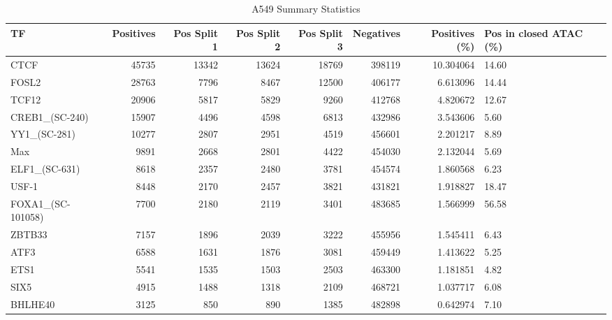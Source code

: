 \begin{table}
\caption{A549 Summary Statistics}
\label{tab:a549}
\begin{tabular}{lrrrrrrl}
\toprule
TF & Positives & Pos Split 1 & Pos Split 2 & Pos Split 3 & Negatives & Positives (\%) & Pos in closed ATAC (\%) \\
\midrule
CTCF & 45735 & 13342 & 13624 & 18769 & 398119 & 10.304064 & 14.60 \\
FOSL2 & 28763 & 7796 & 8467 & 12500 & 406177 & 6.613096 & 14.44 \\
TCF12 & 20906 & 5817 & 5829 & 9260 & 412768 & 4.820672 & 12.67 \\
CREB1\_(SC-240) & 15907 & 4496 & 4598 & 6813 & 432986 & 3.543606 & 5.60 \\
YY1\_(SC-281) & 10277 & 2807 & 2951 & 4519 & 456601 & 2.201217 & 8.89 \\
Max & 9891 & 2668 & 2801 & 4422 & 454030 & 2.132044 & 5.69 \\
ELF1\_(SC-631) & 8618 & 2357 & 2480 & 3781 & 454574 & 1.860568 & 6.23 \\
USF-1 & 8448 & 2170 & 2457 & 3821 & 431821 & 1.918827 & 18.47 \\
FOXA1\_(SC-101058) & 7700 & 2180 & 2119 & 3401 & 483685 & 1.566999 & 56.58 \\
ZBTB33 & 7157 & 1896 & 2039 & 3222 & 455956 & 1.545411 & 6.43 \\
ATF3 & 6588 & 1631 & 1876 & 3081 & 459449 & 1.413622 & 5.25 \\
ETS1 & 5541 & 1535 & 1503 & 2503 & 463300 & 1.181851 & 4.82 \\
SIX5 & 4915 & 1488 & 1318 & 2109 & 468721 & 1.037717 & 6.08 \\
BHLHE40 & 3125 & 850 & 890 & 1385 & 482898 & 0.642974 & 7.10 \\
\bottomrule
\end{tabular}
\end{table}
